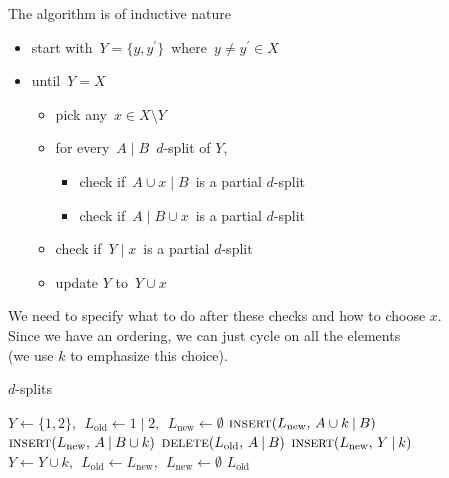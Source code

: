 \documentclass[./main.tex]{subfiles}
\begin{document}
The algorithm is of inductive nature
\begin{itemize}
    \item start with $\, Y = \{y,y^\prime\} \,$ where $\, y \neq y^\prime \in X \,$
    \item until $\, Y = X \,$
        \begin{itemize}
            \item pick any $\, x \in X \setminus Y \,$
            \item for every $\, A \mathbin{|} B \,$ $d$-split of $Y$,
                \begin{itemize}
                    \item check if $\, A \cup x \mathbin{|} B \,$ is a partial $d$-split
                    \item check if $\, A \mathbin{|} B \cup x \,$ is a partial $d$-split
                \end{itemize}
            \item check if $\, Y \mathbin{|} x \,$ is a partial $d$-split
            \item update $Y$ to $\, Y \cup x \,$
        \end{itemize}
\end{itemize}\medskip

We need to specify what to do after these checks and how to choose $x$. \\
Since we have an ordering, we can just cycle on all the elements \\
\bsp (we use $k$ to emphasize this choice).\bigskip

\begin{algorithm}
\caption{$d$-splits}
\begin{algorithmic}[1]
        \State $Y \gets \{1,2\},\ \ L_\text{old} \gets 1 \mathbin{|} 2,\ \ L_\text{new} \gets \emptyset$
             
                    \State $\Call{insert}{L_\text{new},\, A \cup k \mathbin{|} B}$
                \EndIf
                    \State $\Call{insert}{L_\text{new},\, A \mathbin{|} B \cup k}$
                \EndIf
                \State $\Call{delete}{L_\text{old},\, A \mathbin{|} B}$
            \EndFor
                \State $\Call{insert}{L_\text{new},\, Y \mathbin{|} k}$
            \EndIf
            \State $Y \gets Y \cup k,\ \ L_\text{old} \gets L_\text{new},\ \ L_\text{new} \gets \emptyset$
        \EndFor
        \State \Return $L_\text{old}$
    \EndFunction
\end{algorithmic}
\end{algorithm}
\end{document}
